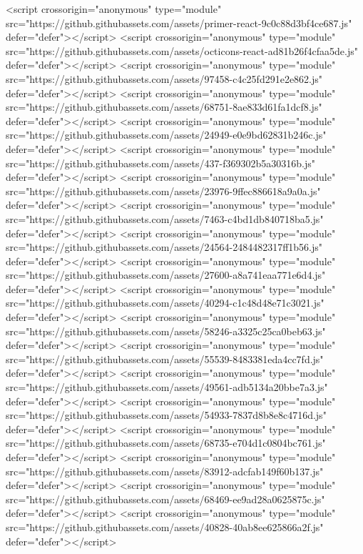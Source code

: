   <script crossorigin="anonymous" type="module" src="https://github.githubassets.com/assets/primer-react-9c0c88d3bf4ce687.js" defer="defer"></script>
<script crossorigin="anonymous" type="module" src="https://github.githubassets.com/assets/octicons-react-ad81b26f4cfaa5de.js" defer="defer"></script>
<script crossorigin="anonymous" type="module" src="https://github.githubassets.com/assets/97458-c4c25fd291e2e862.js" defer="defer"></script>
<script crossorigin="anonymous" type="module" src="https://github.githubassets.com/assets/68751-8ae833d61fa1dcf8.js" defer="defer"></script>
<script crossorigin="anonymous" type="module" src="https://github.githubassets.com/assets/24949-e0e9bd62831b246c.js" defer="defer"></script>
<script crossorigin="anonymous" type="module" src="https://github.githubassets.com/assets/437-f369302b5a30316b.js" defer="defer"></script>
<script crossorigin="anonymous" type="module" src="https://github.githubassets.com/assets/23976-9ffec886618a9a0a.js" defer="defer"></script>
<script crossorigin="anonymous" type="module" src="https://github.githubassets.com/assets/7463-c4bd1db840718ba5.js" defer="defer"></script>
<script crossorigin="anonymous" type="module" src="https://github.githubassets.com/assets/24564-2484482317ff1b56.js" defer="defer"></script>
<script crossorigin="anonymous" type="module" src="https://github.githubassets.com/assets/27600-a8a741eaa771e6d4.js" defer="defer"></script>
<script crossorigin="anonymous" type="module" src="https://github.githubassets.com/assets/40294-c1c48d48e71c3021.js" defer="defer"></script>
<script crossorigin="anonymous" type="module" src="https://github.githubassets.com/assets/58246-a3325c25ca0beb63.js" defer="defer"></script>
<script crossorigin="anonymous" type="module" src="https://github.githubassets.com/assets/55539-8483381eda4cc7fd.js" defer="defer"></script>
<script crossorigin="anonymous" type="module" src="https://github.githubassets.com/assets/49561-adb5134a20bbe7a3.js" defer="defer"></script>
<script crossorigin="anonymous" type="module" src="https://github.githubassets.com/assets/54933-7837d8b8e8c4716d.js" defer="defer"></script>
<script crossorigin="anonymous" type="module" src="https://github.githubassets.com/assets/68735-e704d1c0804bc761.js" defer="defer"></script>
<script crossorigin="anonymous" type="module" src="https://github.githubassets.com/assets/83912-adcfab149f60b137.js" defer="defer"></script>
<script crossorigin="anonymous" type="module" src="https://github.githubassets.com/assets/68469-ee9ad28a0625875c.js" defer="defer"></script>
<script crossorigin="anonymous" type="module" src="https://github.githubassets.com/assets/40828-40ab8ee625866a2f.js" defer="defer"></script>
